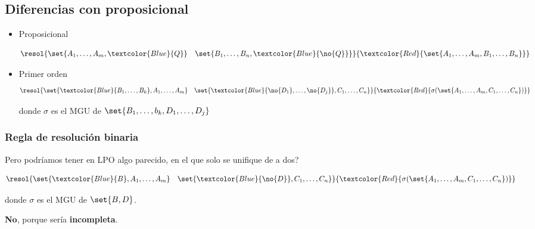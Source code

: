 \documentclass{report}
\theoremstyle{definition} %
\newcommand{\changed}[1]{\textcolor{Red}{#1}}
\newcommand{\select}[1]{\textcolor{Blue}{#1}}
\begin{document}
\subsection{Diferencias con proposicional}

\begin{itemize}
    \item Proposicional
    
    \[
        \resol
        {
            \set{A_1, \dots, A_m, \select{Q}}
            \quad
            \set{B_1, \dots, B_n, \select{\no{Q}}}
        }
        {
            \changed{
                \set{A_1, \dots, A_m, B_1, \dots, B_n}
            }
        }
    \]

    \item Primer orden
    \[
        \resol
        {
            \set{\select{B_1, \dots, B_k}, A_1, \dots, A_m}
            \quad
            \set{\select{\no{D_1}, \dots, \no{D_j}}, C_1, \dots, C_n}
        }
        {
            \changed{
                \sigma(\set{A_1, \dots, A_m, C_1, \dots, C_n})
            }
        }
    \]
    
    donde $\sigma$ es el MGU de $\set{B_1, \dots, b_k, D_1, \dots, D_j}$
\end{itemize}

\subsubsection{Regla de resolución binaria}

Pero podríamos tener en LPO algo parecido, en el que solo se unifique de a dos?

\[
    \resol
    {
        \set{\select{B}, A_1, \dots, A_m}
        \quad
        \set{\select{\no{D}}, C_1, \dots, C_n}
    }
    {
        \changed{
            \sigma(\set{A_1, \dots, A_m, C_1, \dots, C_n})
        }
    }
\]

donde $\sigma$ es el MGU de $\set{B, D}$.

\textbf{No}, porque sería \textbf{incompleta}.
\end{document}
